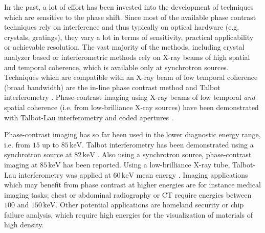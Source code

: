 \documentclass[aip,apl,amsmath,amssymb,floatfix,reprint,a4paper]{revtex4-1}
\newcommand{\unit}[1]{\ensuremath{\, \mathrm{#1}}}
\begin{document}
In the past, a lot of effort has been invested into the development of techniques which are sensitive to the phase shift. Since most of the available phase contrast techniques rely on interference and thus typically on optical hardware (e.g. crystals, gratings), they vary a lot in terms of sensitivity, practical applicability or achievable resolution. The vast majority of the methods, including crystal analyzer based \cite{Davis1995,Chapman1997} or interferometric \cite{Bonse1965,Momose1996} methods rely on X-ray beams of high spatial and temporal coherence, which is available only at synchrotron sources. Techniques which are compatible with an X-ray beam of low temporal coherence (broad bandwidth) are the in-line phase contrast method \cite{Snigirev1995,Wilkins1996,Cloetens1996} and Talbot interferometry \cite{Cloetens1997,David2002,Momose2003a}. Phase-contrast imaging using X-ray beams of low temporal \textit{and} spatial coherence (i.e. from low-brilliance X-ray sources) have been demonstrated with Talbot-Lau interferometry \cite{Pfeiffer2006} and coded apertures \cite{Munro2012}.

Phase-contrast imaging has so far been used in the lower diagnostic energy range, i.e. from $15$ up to $85 \unit{keV}$. Talbot interferometry has been demonstrated using a synchrotron source at $82 \unit{keV}$ \cite{Willner2013}. Also using a synchrotron source, phase-contrast imaging at $85 \unit{keV}$ has been reported. Using a low-brilliance X-ray tube, Talbot-Lau interferometry was applied at $60 \unit{keV}$ mean energy \cite{Donath2009}. Imaging applications which may benefit from phase contrast at higher energies are for instance medical imaging tasks; chest or abdominal radiography or CT require energies between $100$ and $150 \unit{keV}$. Other potential applications are homeland security or chip failure analysis, which require high energies for the visualization of materials of high density.
\end{document}

